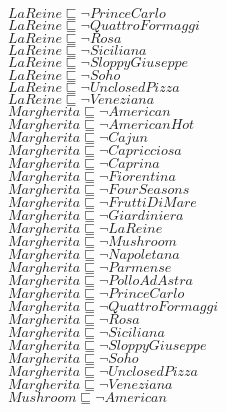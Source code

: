 \documentclass[a4paper,10pt]{article}
\begin{document}
 $LaReine \sqsubseteq  \lnot PrinceCarlo$\\ 
 $LaReine \sqsubseteq  \lnot QuattroFormaggi$\\ 
 $LaReine \sqsubseteq  \lnot Rosa$\\ 
 $LaReine \sqsubseteq  \lnot Siciliana$\\ 
 $LaReine \sqsubseteq  \lnot SloppyGiuseppe$\\ 
 $LaReine \sqsubseteq  \lnot Soho$\\ 
 $LaReine \sqsubseteq  \lnot UnclosedPizza$\\ 
 $LaReine \sqsubseteq  \lnot Veneziana$\\ 
 $Margherita \sqsubseteq  \lnot American$\\ 
 $Margherita \sqsubseteq  \lnot AmericanHot$\\ 
 $Margherita \sqsubseteq  \lnot Cajun$\\ 
 $Margherita \sqsubseteq  \lnot Capricciosa$\\ 
 $Margherita \sqsubseteq  \lnot Caprina$\\ 
 $Margherita \sqsubseteq  \lnot Fiorentina$\\ 
 $Margherita \sqsubseteq  \lnot FourSeasons$\\ 
 $Margherita \sqsubseteq  \lnot FruttiDiMare$\\ 
 $Margherita \sqsubseteq  \lnot Giardiniera$\\ 
 $Margherita \sqsubseteq  \lnot LaReine$\\ 
 $Margherita \sqsubseteq  \lnot Mushroom$\\ 
 $Margherita \sqsubseteq  \lnot Napoletana$\\ 
 $Margherita \sqsubseteq  \lnot Parmense$\\ 
 $Margherita \sqsubseteq  \lnot PolloAdAstra$\\ 
 $Margherita \sqsubseteq  \lnot PrinceCarlo$\\ 
 $Margherita \sqsubseteq  \lnot QuattroFormaggi$\\ 
 $Margherita \sqsubseteq  \lnot Rosa$\\ 
 $Margherita \sqsubseteq  \lnot Siciliana$\\ 
 $Margherita \sqsubseteq  \lnot SloppyGiuseppe$\\ 
 $Margherita \sqsubseteq  \lnot Soho$\\ 
 $Margherita \sqsubseteq  \lnot UnclosedPizza$\\ 
 $Margherita \sqsubseteq  \lnot Veneziana$\\ 
 $Mushroom \sqsubseteq  \lnot American$\\ 
\end{document}
